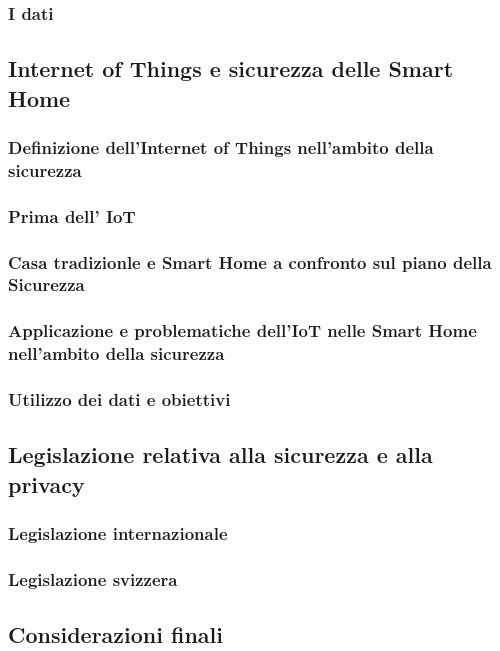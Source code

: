 \documentclass{article}
\begin{document}
\subsubsection{I dati}

\subsection{Internet of Things e sicurezza delle Smart Home}

\subsubsection{Definizione dell'Internet of Things nell'ambito della sicurezza}

\subsubsection{Prima dell' IoT}

\subsubsection{Casa tradizionle e Smart Home a confronto sul piano della Sicurezza}

\subsubsection{Applicazione e problematiche dell’IoT nelle Smart Home nell’ambito della sicurezza}

\subsubsection{Utilizzo dei dati e obiettivi}

\subsection{Legislazione relativa alla sicurezza e alla privacy}
\subsubsection{Legislazione internazionale}

\subsubsection{Legislazione svizzera}

\subsection{Considerazioni finali}

\newpage
\end{document}
